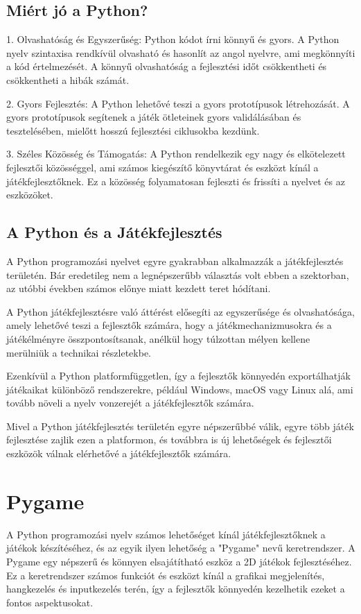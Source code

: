 \subsection{Miért jó a Python?}
1. Olvashatóság és Egyszerűség:
Python kódot írni könnyű és gyors. A Python nyelv szintaxisa rendkívül olvasható és hasonlít az angol nyelvre, ami megkönnyíti a kód értelmezését. A könnyű olvashatóság a fejlesztési időt csökkentheti és csökkentheti a hibák számát.

2. Gyors Fejlesztés:
A Python lehetővé teszi a gyors prototípusok létrehozását. A gyors prototípusok segítenek a játék ötleteinek gyors validálásában és tesztelésében, mielőtt hosszú fejlesztési ciklusokba kezdünk.

3. Széles Közösség és Támogatás:
A Python rendelkezik egy nagy és elkötelezett fejlesztői közösséggel, ami számos kiegészítő könyvtárat és eszközt kínál a játékfejlesztőknek. Ez a közösség folyamatosan fejleszti és frissíti a nyelvet és az eszközöket.


\subsection{A Python és a Játékfejlesztés}
A Python programozási nyelvet egyre gyakrabban alkalmazzák a játékfejlesztés területén. Bár eredetileg nem a legnépszerűbb választás volt ebben a szektorban, az utóbbi években számos előnye miatt kezdett teret hódítani.

A Python játékfejlesztésre való áttérést elősegíti az egyszerűsége és olvashatósága, amely lehetővé teszi a fejlesztők számára, hogy a játékmechanizmusokra és a játékélményre összpontosítsanak, anélkül hogy túlzottan mélyen kellene merülniük a technikai részletekbe.

Ezenkívül a Python platformfüggetlen, így a fejlesztők könnyedén exportálhatják játékaikat különböző rendszerekre, például Windows, macOS vagy Linux alá, ami tovább növeli a nyelv vonzerejét a játékfejlesztők számára.

Mivel a Python játékfejlesztés területén egyre népszerűbbé válik, egyre több játék fejlesztése zajlik ezen a platformon, és továbbra is új lehetőségek és fejlesztői eszközök válnak elérhetővé a játékfejlesztők számára.

\section{Pygame}
A Python programozási nyelv számos lehetőséget kínál játékfejlesztőknek a játékok készítéséhez, és az egyik ilyen lehetőség a "Pygame" nevű keretrendszer. A Pygame egy népszerű és könnyen elsajátítható eszköz a 2D játékok fejlesztéséhez. Ez a keretrendszer számos funkciót és eszközt kínál a grafikai megjelenítés, hangkezelés és inputkezelés terén, így a fejlesztők könnyedén kezelhetik ezeket a fontos aspektusokat.

